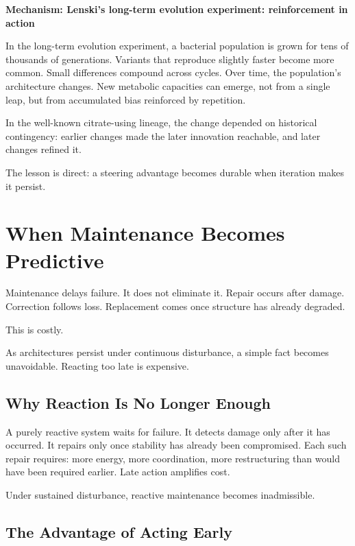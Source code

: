 \documentclass[11pt,twoside,openright]{book}
\newenvironment{mechanismbox}[1]
  {\begin{framed}\noindent\textbf{Mechanism: #1}\par\medskip}
  {\end{framed}}
\begin{document}
\begin{mechanismbox}{Lenski's long-term evolution experiment: reinforcement in action}

In the long-term evolution experiment, a bacterial population is grown for tens of thousands of generations. Variants that reproduce slightly faster become more common. Small differences compound across cycles. Over time, the population's architecture changes. New metabolic capacities can emerge, not from a single leap, but from accumulated bias reinforced by repetition.

In the well-known citrate-using lineage, the change depended on historical contingency: earlier changes made the later innovation reachable, and later changes refined it.

The lesson is direct:
a steering advantage becomes durable
when iteration makes it persist.
\end{mechanismbox}


\chapter{When Maintenance Becomes Predictive}
\label{ch:predictive_maintenance}

Maintenance delays failure. It does not eliminate it. Repair occurs after damage. Correction follows loss. Replacement comes once structure has already degraded.

This is costly.

As architectures persist under continuous disturbance, a simple fact becomes unavoidable. Reacting too late is expensive.

\section*{Why Reaction Is No Longer Enough}

A purely reactive system waits for failure. It detects damage only after it has occurred. It repairs only once stability has already been compromised. Each such repair requires: more energy, more coordination, more restructuring than would have been required earlier. Late action amplifies cost.

Under sustained disturbance, reactive maintenance becomes inadmissible.

\section*{The Advantage of Acting Early}
\end{document}
